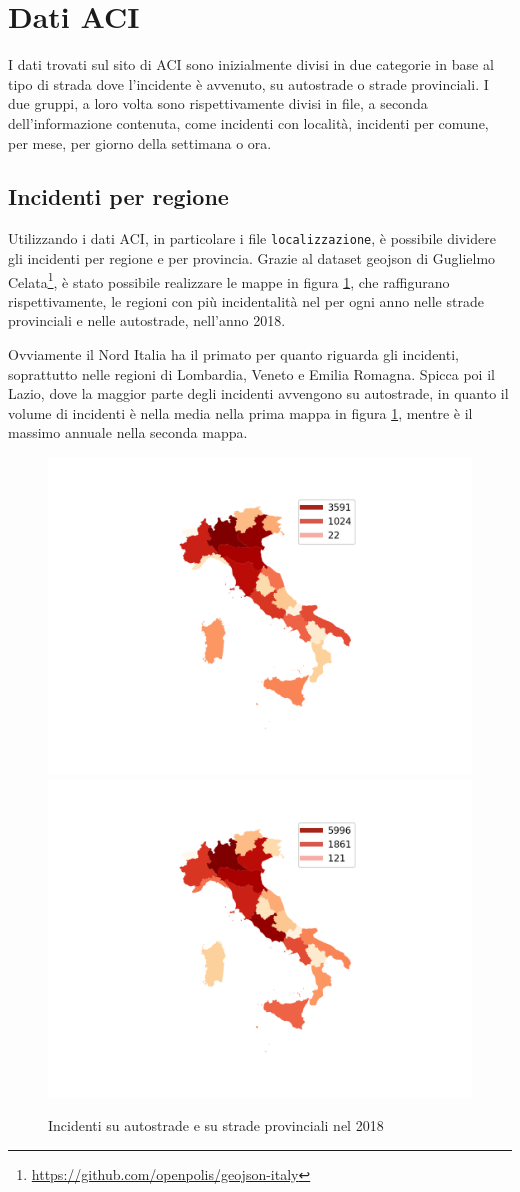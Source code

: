 \documentclass[a4paper,12pt]{report}
\newcommand{\columnstyle}[1]{\texttt{#1}}
\begin{document}
\section{Dati ACI}

I dati trovati sul sito di ACI sono inizialmente divisi in due categorie in 
base al tipo di strada dove l'incidente è avvenuto, 
su autostrade o strade provinciali.
I due gruppi, a loro volta sono rispettivamente divisi in file, a seconda 
dell'informazione contenuta, come incidenti con località, incidenti per 
comune, per mese, per giorno della settimana o ora.

\subsection{Incidenti per regione}

Utilizzando i dati ACI, in particolare i file \columnstyle{localizzazione}, è 
possibile dividere gli incidenti per regione e per provincia.
Grazie al dataset geojson di Guglielmo 
Celata\footnote{\url{https://github.com/openpolis/geojson-italy}}, 
è stato possibile realizzare le mappe in figura \ref{fig:incidenti-per-regione}, 
che raffigurano rispettivamente, le regioni con più incidentalità nel per ogni 
anno nelle strade provinciali e nelle autostrade, nell'anno 2018.

Ovviamente il Nord Italia ha il primato per quanto riguarda gli incidenti, 
soprattutto nelle regioni di Lombardia, Veneto e Emilia Romagna. 
Spicca poi il Lazio, dove la maggior parte degli incidenti avvengono su autostrade, 
in quanto il volume di incidenti è nella media nella prima mappa in figura 
\ref{fig:incidenti-per-regione}, mentre è il massimo annuale nella seconda mappa.

\begin{figure}
    \includegraphics[width=0.5\linewidth]{../src/incidenti/incidenti_aci/mappe_regioni/incidenti_regione.png}
    \includegraphics[width=0.5\linewidth]{../src/incidenti/incidenti_aci/mappe_regioni/incidenti_regione_autostrade.png}
    \caption{Incidenti su autostrade e su strade provinciali nel 2018}
    \label{fig:incidenti-per-regione}
\end{figure}
\end{document}

